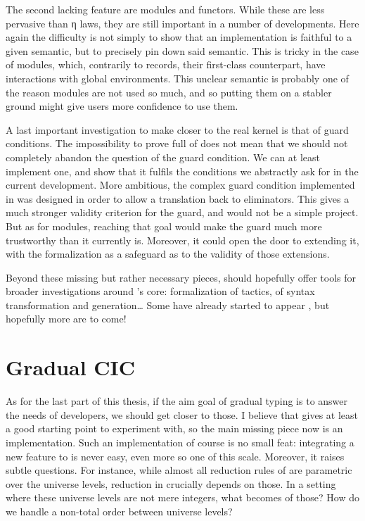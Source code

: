 The second lacking feature are modules and functors.
While these are less pervasive than η laws, they are still important in a number of developments.
Here again the difficulty is not simply to show that an implementation is faithful to a given
semantic, but to precisely pin down said semantic. This is tricky in the case of modules, which,
contrarily to records, their first-class counterpart, have interactions with global environments.
This unclear semantic is probably one of the reason modules are not used so much, and so putting
them on a stabler ground might give users more confidence to use them.

A last important investigation to make  closer to the real kernel is that of
guard conditions. The impossibility to prove full  of 
does not mean that we should not completely abandon the question of the guard condition. We
can at least implement one, and show that it fulfils the conditions we abstractly ask for
in the current development. More ambitious, the complex guard condition implemented in 
was designed in order to allow a translation back to eliminators. This gives a much stronger
validity criterion for the guard, and would not be a simple project. But as for modules, reaching
that goal would make the guard much more trustworthy than it currently is. Moreover,
it could open the door to extending it, with the formalization
as a safeguard as to the validity of those extensions.

Beyond these missing but rather necessary pieces,
 should hopefully offer tools for
broader investigations around ’s core: formalization of tactics,
of syntax transformation and generation… Some have already started to appear
, but hopefully more are to come!

\section{Gradual CIC}

As for the last part of this thesis, if the aim goal of gradual typing
is to answer the needs of developers, we should get closer to those.
I believe that  gives at least a good starting point to experiment with,
so the main missing piece now is an implementation.
Such an implementation of course is no small feat: integrating a new feature to  is
never easy, even more so one of this scale.
Moreover, it raises subtle questions. For instance, while almost all reduction rules of
 are parametric over the universe levels, reduction in  crucially
depends on those. In a setting where these universe levels are not mere integers,
what becomes of those? How do we handle a non-total order between universe levels?